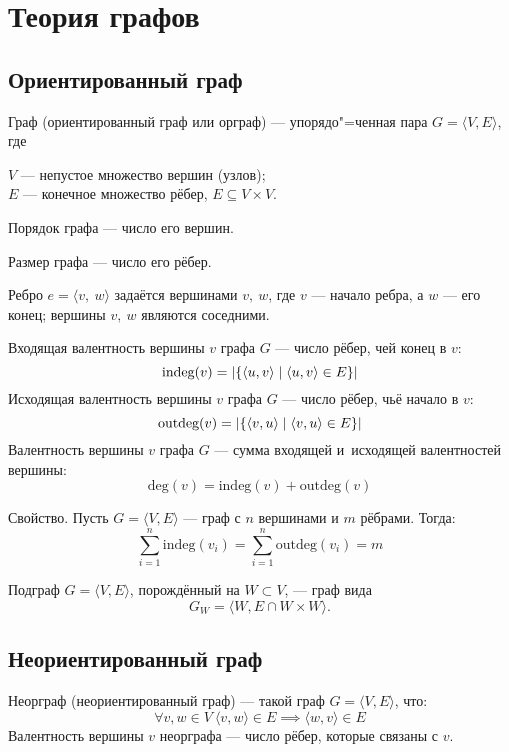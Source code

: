 \section{Теория графов}

\subsection{Ориентированный граф}

{\bold Граф} {\ital (ориентированный граф или орграф)} --- упорядо"=ченная пара $G=\langle V,E\rangle$, где

$V$ --- непустое множество {\ital вершин {\color{desc}(узлов)}};\\
$E$ --- конечное множество {\ital рёбер}, $E\subseteq V\times V$.

{\bold Порядок} графа --- число его вершин.

{\bold Размер} графа --- число его рёбер.

Ребро $e=\langle v,\ w\rangle$ задаётся вершинами $v,\ w$, где $v$ --- начало ребра, а $w$ --- его конец; вершины $v,\ w$ являются {\ital соседними}.

{\bold Входящая} {\ital валентность} вершины $v$ графа $G$ --- число рёбер, чей конец в $v$:
$$\text{indeg}(v)=\left|\{\langle u,v\rangle\mid\langle u,v\rangle\in E\}\right|$$
{\bold Исходящая} {\ital валентность} вершины $v$ графа $G$ --- число рёбер, чьё начало в $v$:
$$\text{outdeg}(v)=\left|\{\langle v,u\rangle\mid\langle v,u\rangle\in E\}\right|$$
{\bold Валентность} вершины $v$ графа $G$ --- сумма входящей и~исходящей валентностей вершины:
$$\text{deg}(v)=\text{indeg}(v)+\text{outdeg}(v)$$
\begin{theorem}
{\bold Свойство.} Пусть $G=\langle V,E\rangle$ --- граф с $n$ вершинами и $m$ рёбрами. Тогда:
$$\sum_{i=1}^{n}\text{indeg}(v_i)=\sum_{i=1}^{n}\text{outdeg}(v_i)=m$$
\end{theorem}
{\bold Подграф} $G=\langle V,E\rangle$, {\ital порождённый} на $W\subset V$, --- граф вида
$$G_W=\langle W,E\cap W\times W\rangle.$$

\newpage
\subsection{Неориентированный граф}

{\bold Неорграф} {\ital (неориентированный граф)} --- такой граф $G=\langle V,E\rangle$, что:
$$\forall v,w\in V\ \langle v,w\rangle\in E\implies\langle w,v\rangle\in E$$
{\bold Валентность} вершины $v$ неорграфа --- число рёбер, которые связаны с $v$.

